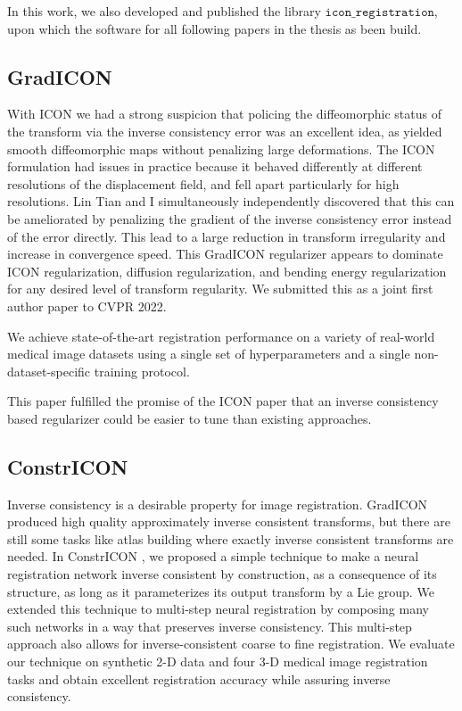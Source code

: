\documentclass{article}
\begin{document}
In this work, we also developed and published the library $\texttt{icon\_registration}$, upon which the software for all following papers in the thesis as been build.
\subsection{GradICON}

With ICON we had a strong suspicion that policing the diffeomorphic status of the transform via the inverse consistency error was an excellent idea, as yielded smooth diffeomorphic maps without penalizing large deformations. The ICON formulation had issues in practice because it behaved differently at different resolutions of the displacement field, and fell apart particularly for high resolutions.
Lin Tian and I simultaneously independently discovered that this can be ameliorated by penalizing the gradient of the inverse consistency error instead of the error directly. This lead to a large reduction in transform irregularity and increase in convergence speed. This GradICON regularizer appears to dominate ICON regularization, diffusion regularization, and bending energy regularization for any desired level of transform regularity. We submitted this as a joint first author paper to CVPR 2022. 

	We achieve state-of-the-art registration
	performance on a variety of real-world medical image datasets using a single
	set of hyperparameters and a single non-dataset-specific training protocol.

This paper fulfilled the promise of the ICON paper that an inverse consistency
based regularizer could be easier to tune than existing approaches.

\subsection{ConstrICON}


	Inverse consistency is a desirable property for image registration. GradICON produced high quality approximately inverse consistent transforms, but there are still some tasks like atlas building where exactly inverse consistent transforms are needed. In ConstrICON
\cite{Greer2023InverseCB}, we proposed
	a simple technique to make a neural registration network inverse consistent by
	construction, as a consequence of its structure, as long as it parameterizes
	its output transform by a Lie group. We extended this technique to multi-step
	neural registration by composing many such networks in a way that preserves
	inverse consistency. This multi-step approach also allows for
	inverse-consistent coarse to fine registration. We evaluate our technique on
	synthetic 2-D data and four 3-D medical image registration tasks and obtain
	excellent registration accuracy while assuring inverse consistency.%
\end{document}

